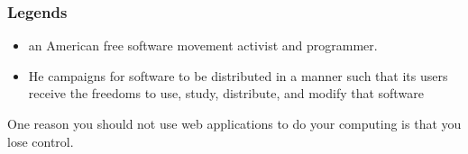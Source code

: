 \documentclass{../c-lecture}
\begin{document}
\begin{frame}
  \frametitle{Legends}
  \begin{itemize}
    \item an American free software movement activist and programmer.
    \item He campaigns for software to be distributed in a manner such that its users receive the freedoms to use, study, distribute, and modify that software
  \end{itemize}
  \begin{block}{}
    One reason you should not use web applications to do your computing is that you lose control.
  \end{block}
\end{frame}
\end{document}
